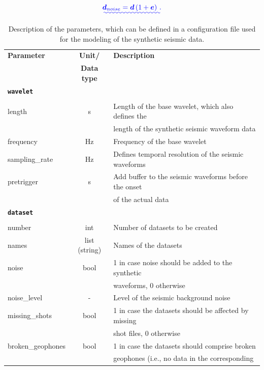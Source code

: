\documentclass[a4paper,fleqn]{cas-sc}
\newcommand{\vecmat}[1]{\bm #1} %
\providecommand{\DIFadd}[1]{{\protect\color{blue}\uwave{#1}}} %
\providecommand{\DIFaddend}{} %
\DeclareRobustCommand{\DIFaddend}{\DIFOaddend \let\includegraphics\DIFOincludegraphics} %
\begin{document}
\begin{equation}
	\DIFadd{\vecmat{d_{noise}}=\vecmat{d}\left(1 + \vecmat{e}\right)\,.
	\label{eq:noisydata}
}\end{equation}

\DIFaddend \begin{table}[]
    \caption{Description of the parameters, which can be defined in a configuration file used for the modeling of the synthetic seismic data.}
    \centering
    \begin{tabular*}{\tblwidth}{@{} LCL@{}}
        \toprule
        \textbf{Parameter} & \textbf{Unit/} & \textbf{Description} \\
         & \textbf{Data type} & \\ 
        \midrule
        \textbf{\texttt{wavelet}} & & \\
         & & \\
        length & s & Length of the base wavelet, which also defines the \\
         & & length of the synthetic seismic waveform data \\ 
        frequency & Hz & Frequency of the base wavelet \\ 
        sampling\_rate & Hz & Defines temporal resolution of the seismic waveforms \\ 
        pretrigger & s & Add buffer to the seismic waveforms before the onset \\
         & & of the actual data \\
        \midrule
        \textbf{\texttt{dataset}} & & \\
         & & \\
        number & int & Number of datasets to be created \\
        names & list (string) & Names of the datasets \\
        noise & bool & 1 in case noise should be added to the synthetic \\
         & & waveforms, 0 otherwise \\
        noise\_level & - & Level of the seismic background noise \\
        missing\_shots & bool & 1 in case the datasets should be affected by missing \\
         & & shot files, 0 otherwise \\
        broken\_geophones & bool & 1 in case the datasets should comprise broken \\
         & & geophones (i.e., no data in the corresponding \\

\end{tabular*}
\end{table}
\end{document}
